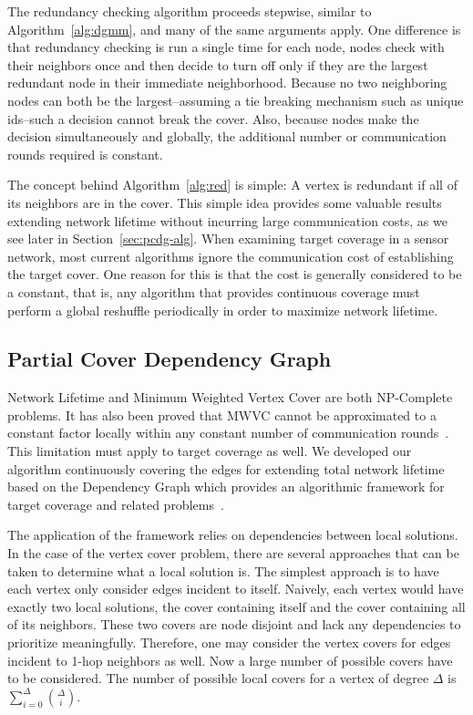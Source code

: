 \documentclass[technote, 10pt, letter]{IEEEtran}
\begin{document}
 



The redundancy checking algorithm proceeds stepwise, similar to Algorithm~\ref{alg:dgmm}, and many of the same arguments apply. One difference is that redundancy checking is run a single time for each node, nodes check with their neighbors once and then decide to turn off only if they are the largest redundant node in their immediate neighborhood. Because no two neighboring nodes can both be the largest--assuming a tie breaking mechanism such as unique ids--such a decision cannot break the cover. Also, because nodes make the decision simultaneously and globally, the additional number or communication rounds required is constant.

The concept behind Algorithm~\ref{alg:red} is simple: A vertex is redundant if all of its neighbors are in the cover. This simple idea provides some valuable results extending network lifetime without incurring large communication costs, as we see later in Section~\ref{sec:pcdg-alg}. When examining target coverage in a sensor network, most current algorithms ignore the communication cost of establishing the target cover\cite{1514028}. One reason for this is that the cost is generally considered to be a constant, that is, any algorithm that provides continuous coverage must perform a global reshuffle periodically in order to maximize network lifetime. 

\subsection{Partial Cover Dependency Graph}
\label{sec:life-depend}
Network Lifetime and Minimum Weighted Vertex Cover are both NP-Complete problems. It has also been proved that MWVC cannot be approximated to a constant factor locally within any constant number of communication rounds~\cite{1011811}. This limitation must apply to target coverage as well. We developed our algorithm continuously covering the edges for extending total network lifetime based on the Dependency Graph which provides an algorithmic framework for target coverage and related problems~\cite{IPDPS.2008.45361}. 

The application of the framework relies on dependencies between local solutions. In the case of the vertex cover problem, there are several approaches that can be taken to determine what a local solution is. The simplest approach is to have each vertex only consider edges incident to itself. Naively, each vertex would have exactly two local solutions, the cover containing itself and the cover containing all of its neighbors. These two covers are node disjoint and lack any dependencies to prioritize meaningfully.   Therefore, one may consider the vertex covers for edges incident to 1-hop neighbors as well. Now a large number of possible covers have to be considered. The number of possible local covers for a vertex of degree $\Delta$ is $\sum_{i=0}^\Delta \binom{\Delta}{i}$. 
\end{document}
